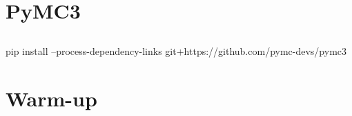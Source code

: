 \documentclass[table,dvipsnames]{beamer}
\begin{document}
% 
% 


\section{PyMC3}
\subsection{}

\begin{frame}[fragile]
\tiny
\begin{code}
pip install --process-dependency-links git+https://github.com/pymc-devs/pymc3
\end{code}
\footnotesize
\end{frame}






\section{Warm-up}
\end{document}
